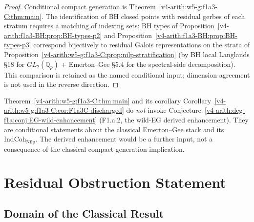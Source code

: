 \begin{proof}
Conditional compact generation is
Theorem~\ref{v4-arith:w5-g:f1a3-C:thm:main}. The identification of BH closed
points with residual gerbes of each stratum requires a matching of indexing
sets: BH types of Proposition~\ref{v4-arith:f1a3-BH:prop:BH-types-p2} and
Proposition~\ref{v4-arith:f1a3-BH:prop:BH-types-p3} correspond bijectively to
residual Galois representations on the strata of
Proposition~\ref{v4-arith:w5-g:f1a3-C:prop:nilp-stratification} (by BH local
Langlands \S 18 for \(GL_{2}(\mathbb{Q}_{p})\) + Emerton--Gee \S 5.4
for the spectral-side decomposition). This comparison is retained as
the named conditional input; dimension agreement is not used in the
reverse direction.
\end{proof}

\begin{remark}
\label{v4-arith:w5-g:f1a3-C:rem:independence}
Theorem~\ref{v4-arith:w5-g:f1a3-C:thm:main} and its corollary
Corollary~\ref{v4-arith:w5-g:f1a3-C:cor:F1a3C-discharged} do \emph{not} invoke
Conjecture~\ref{v4-arith:deg-f1a:conj:EG-wild-enhancement} (F1.a.2, the wild-EG
derived enhancement). They are conditional statements about the
classical Emerton--Gee stack and its \(\mathrm{IndCoh}_{\mathrm{Nilp}}\).
The derived enhancement would be a further input, not a consequence of
the classical compact-generation implication.
\end{remark}

\section{Residual Obstruction Statement}
\label{v4-arith:w5-g:f1a3-C:residual-obstruction}

\subsection{Domain of the Classical Result}

